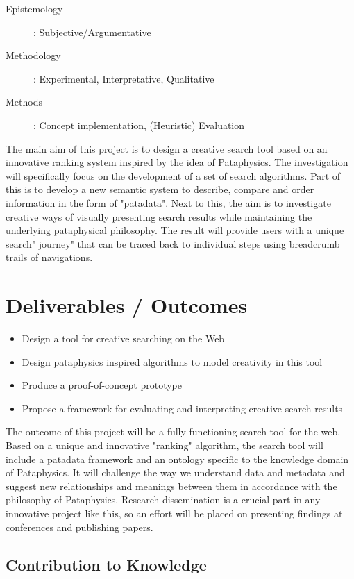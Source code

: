\begin{description}
  \item [Epistemology]: Subjective/Argumentative
  \item [Methodology]: Experimental, Interpretative, Qualitative
  \item [Methods]: Concept implementation, (Heuristic) Evaluation
\end{description}

The main aim of this project is to design a creative search tool based on an innovative ranking system inspired by the idea of Pataphysics. The investigation will specifically focus on the development of a set of search algorithms. Part of this is to develop a new semantic system to describe, compare and order information in the form of "patadata". Next to this, the aim is to investigate creative ways of visually presenting search results while maintaining the underlying pataphysical philosophy. The result will provide users with a unique search" journey" that can be traced back to individual steps using breadcrumb trails of navigations.

\section{Deliverables / Outcomes}

\begin{itemize}
  \item Design a tool for creative searching on the Web
  \item Design pataphysics inspired algorithms to model creativity in this tool
  \item Produce a proof-of-concept prototype
  \item Propose a framework for evaluating and interpreting creative search results
\end{itemize}

The outcome of this project will be a fully functioning search tool for the web. Based on a unique and innovative "ranking" algorithm, the search tool will include a patadata framework and an ontology specific to the knowledge domain of Pataphysics. It will challenge the way we understand data and metadata and suggest new relationships and meanings between them in accordance with the philosophy of Pataphysics.  Research dissemination is a crucial part in any innovative project like this, so an effort will be placed on presenting findings at conferences and publishing papers.


\subsection{Contribution to Knowledge}

